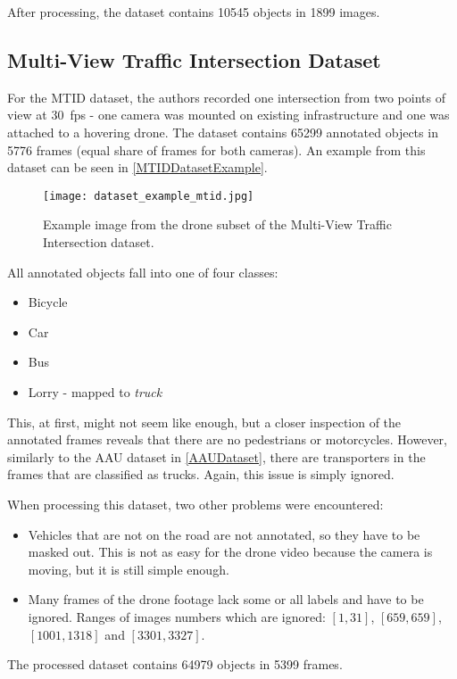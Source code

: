 After processing, the dataset contains \num{10545} objects in \num{1899} images.


\subsection{Multi-View Traffic Intersection Dataset}

For the MTID dataset, the authors \cite{Jensen2020} recorded one intersection
from two points of view at \SI{30}{fps} - one camera was mounted on existing
infrastructure and one was attached to a hovering drone. The dataset contains
\num{65299} annotated objects in \num{5776} frames (equal share of frames for
both cameras). An example from this dataset can be seen in
\autoref{MTIDDatasetExample}.

\begin{figure}[h]
    \centering
    \texttt{[image: dataset\_example\_mtid.jpg]}
    \caption{Example image from the drone subset of the Multi-View Traffic Intersection dataset.}
    \label{MTIDDatasetExample}
\end{figure}

All annotated objects fall into one of four classes:
\begin{itemize}
    \item Bicycle
    \item Car
    \item Bus
    \item Lorry - mapped to \textit{truck}
\end{itemize}
This, at first, might not seem like enough, but a closer inspection of the
annotated frames reveals that there are no pedestrians or motorcycles. However,
similarly to the AAU dataset in \autoref{AAUDataset}, there are transporters in the frames
that are classified as trucks. Again, this issue is simply ignored.

When processing this dataset, two other problems were encountered:
\begin{itemize}
    \item Vehicles that are not on the road are not annotated, so they have to
    be masked out. This is not as easy for the drone video because the camera is
    moving, but it is still simple enough.
    \item Many frames of the drone footage lack some or all labels and have to
    be ignored. Ranges of images numbers which are ignored: $[1,31]$,
    $[659,659]$, $[1001,1318]$ and $[3301,3327]$.
\end{itemize}
The processed dataset contains \num{64979} objects in \num{5399} frames.


